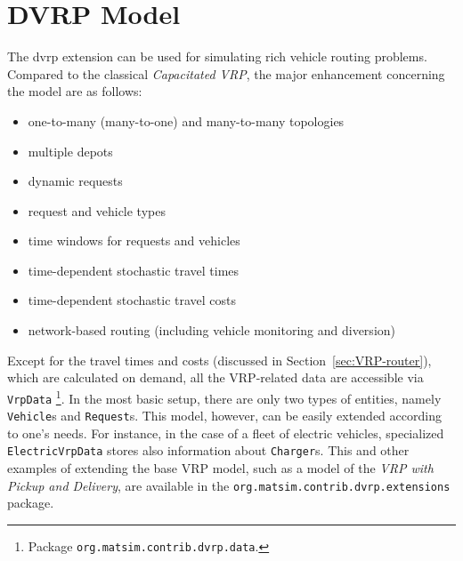 \section{DVRP Model}
\label{sec:DVRP_model}
The \gls{dvrp} extension can be used for simulating rich vehicle routing problems. Compared to the classical \emph{Capacitated VRP}, the major enhancement concerning the model are as follows:
%
\begin{itemize}
	\item one-to-many (many-to-one) and many-to-many topologies
	\item multiple depots
	\item dynamic requests
	\item request and vehicle types
	\item time windows for requests and vehicles
	\item time-dependent stochastic travel times
	\item time-dependent stochastic travel costs
	\item network-based routing (including vehicle monitoring and diversion)
\end{itemize}
%
Except for the travel times and costs (discussed in Section~\ref{sec:VRP-router}), which are calculated on demand, all the VRP-related data are accessible via \lstinline$VrpData$%
\footnote{
Package \lstinline$org.matsim.contrib.dvrp.data$.
}.
In the most basic setup, there are only two types of entities, namely \lstinline$Vehicle$s and \lstinline$Request$s. This model, however, can be easily extended according to one's needs. For instance, in the case of a fleet of electric vehicles, specialized \lstinline$ElectricVrpData$ stores also information about \lstinline$Charger$s. This and other examples of extending the base VRP model, such as a model of the \emph{VRP with Pickup and Delivery}, are available in the \lstinline$org.matsim.contrib.dvrp.extensions$ package.

